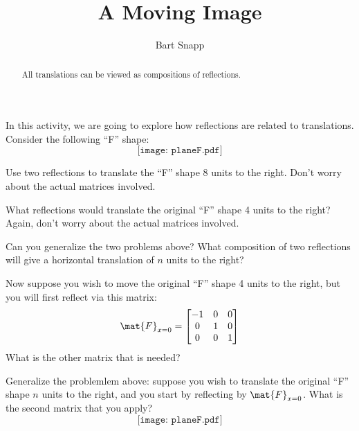 \documentclass{ximera}
\title{A Moving Image}
\author{Bart Snapp}
\begin{document}
\begin{abstract}
  All translations can be viewed as compositions of reflections.
\end{abstract}
\maketitle

In this activity, we are going to explore how reflections are related
to translations.  Consider the following ``F'' shape:
\[
\texttt{[image: planeF.pdf]}
\]

\begin{problem}
Use two reflections to translate the ``F'' shape 8 units to the
right. Don't worry about the actual matrices involved.
\end{problem}

\begin{problem}
What reflections would translate the original ``F'' shape 4 units to
the right? Again, don't worry about the actual matrices involved.
\end{problem}

\begin{problem}
Can you generalize the two problems above? What composition of two
reflections will give a horizontal translation of $n$ units to the
right?
\end{problem}

\begin{problem} 
Now suppose you wish to move the original ``F'' shape 4 units to the
right, but you will first reflect via this matrix:
\[
\mat{F}_{x=0}  = 
\begin{bmatrix}
-1 & 0 & 0 \\
0 & 1 & 0 \\
0 & 0 & 1
\end{bmatrix}
\]
What is the other matrix that is needed?
\end{problem}

\begin{problem}
Generalize the problemlem above: suppose you wish to translate the
original ``F'' shape $n$ units to the right, and you start by
reflecting by $\mat{F}_{x=0}$. What is the second matrix that you
apply?
\[
\texttt{[image: planeF.pdf]}
\]
\end{problem}
\end{document}
